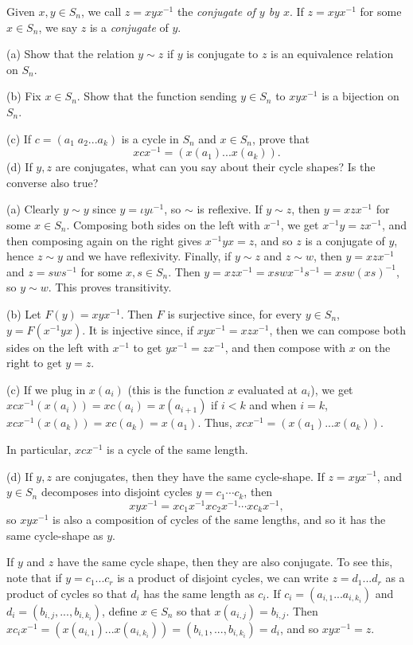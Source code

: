 \documentclass[11pt,dvipsnames]{book}
\numberwithin{equation}{section} %
\numberwithin{figure}{section} %
\numberwithin{table}{section} %
\begin{document}
\begin{exercise}
 Given $x,y\in S_{n}$, we call $z=xyx^{-1}$ the {\it conjugate of $y$ by $x$}. If $z=xyx^{-1}$ for some $x\in S_{n}$, we say $z$ is a {\it conjugate} of $y$. 

(a) Show that the relation $y\sim z$ if $y$ is conjugate to $z$ is an equivalence relation on $S_{n}$. 

(b) Fix $x\in S_{n}$. Show that the function sending $y\in S_{n}$ to $xyx^{-1}$ is a bijection on $S_{n}$. 

(c) If $c=(a_{1} \; a_{2}...a_{k})$ is a cycle in $S_{n}$ and $x\in S_{n}$, prove that 
\[
xcx^{-1}=(x(a_{1})...x(a_{k})). 
\]
(d) If $y,z$ are conjugates, what can you say about their cycle shapes? Is the converse also true?



\begin{solution}
(a) Clearly $y\sim y$ since $y=\iota y\iota^{-1}$, so $\sim$ is reflexive. If $y\sim z$, then $y=xzx^{-1}$ for some $x\in S_{n}$. Composing both sides on the left with $x^{-1}$, we get $x^{-1}y=zx^{-1}$, and then composing again on the right gives $x^{-1}yx=z$, and so $z$ is a conjugate of $y$, hence $z\sim y$ and we have reflexivity. Finally, if $y\sim z$ and $z\sim w$, then $y=xzx^{-1}$ and $z=sws^{-1}$ for some $x,s\in S_{n}$. Then $y=xzx^{-1} = xswx^{-1}s^{-1} = xsw(xs)^{-1}$, so $y\sim w$. This proves transitivity.

(b) Let $F(y)=xyx^{-1}$. Then $F$ is surjective since, for every $y\in S_{n}$, $y=F(x^{-1}yx)$. It is injective since, if $xyx^{-1}=xzx^{-1}$, then we can compose both sides on the left with $x^{-1}$ to get $yx^{-1}=zx^{-1}$, and then compose with $x$ on the right to get $y=z$. 

(c) If we plug in $x(a_{i})$ (this is the function $x$ evaluated at $a_{i}$), we get $xcx^{-1}(x(a_{i}))=xc(a_{i})=x(a_{i+1})$ if $i<k$ and when $i=k$, $xcx^{-1}(x(a_{k}))=xc(a_{k})=x(a_{1})$. Thus, $xcx^{-1}=(x(a_{1})...x(a_{k}))$. 

In particular, $xcx^{-1}$ is a cycle of the same length.

(d) If $y,z$ are conjugates, then they have the same cycle-shape. If $z=xyx^{-1}$, and $y\in S_{n}$ decomposes into disjoint cycles $y=c_{1}\cdots c_{k}$, then 
\[
xyx^{-1}=xc_{1}x^{-1} xc_{2}x^{-1}\cdots xc_{k}x^{-1}, \]
so $xyx^{-1}$ is also a composition of cycles of the same lengths, and so it has the same cycle-shape as $y$. 

If $y$ and $z$ have the same cycle shape, then they are also conjugate. To see this, note that if $y=c_1...c_{r}$ is a product of disjoint cycles, we can write $z=d_{1}...d_{r}$ as a product of cycles so that $d_{i}$ has the same length as $c_{i}$. If $c_{i}=(a_{i,1}...a_{i,k_i})$ and $d_{i}=(b_{i,j},...,b_{i,k_{i}})$, define $x\in S_{n}$ so that $x(a_{i,j})=b_{i,j}$. Then $xc_ix^{-1}=(x(a_{i,1})...x(a_{i,k_i}))=(b_{i,1},...,b_{i,k_{i}})=d_i$, and so $xyx^{-1}=z$. 
\end{solution}







\end{exercise}
\end{document}

